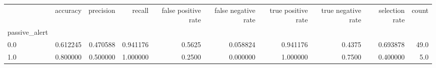 \begin{tabular}{lrrrrrrrrr}
\toprule
{} &  accuracy &  precision &    recall &  false positive rate &  false negative rate &  true positive rate &  true negative rate &  selection rate &  count \\
passive\_alert &           &            &           &                      &                      &                     &                     &                 &        \\
\midrule
0.0           &  0.612245 &   0.470588 &  0.941176 &               0.5625 &             0.058824 &            0.941176 &              0.4375 &        0.693878 &   49.0 \\
1.0           &  0.800000 &   0.500000 &  1.000000 &               0.2500 &             0.000000 &            1.000000 &              0.7500 &        0.400000 &    5.0 \\
\bottomrule
\end{tabular}
